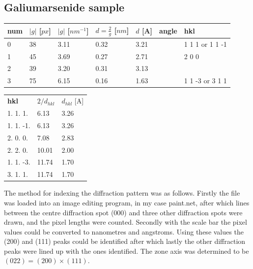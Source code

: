 \documentclass[a4paper]{scrartcl}
\begin{document}
\subsection*{Galiumarsenide sample}
\begin{table}[H]
  \centering
  \begin{tabular}{lllllll}
    \textbf{num} & $|g|$ [$px$] & $|g|$ [$nm^{-1}$] & $d=\frac{2}{g}$ [$nm$] & $d$ [A] & \textbf{angle} & \textbf{hkl}    \\ \hline
    0            & 38           & 3.11              & 0.32                   & 3.21    &                & 1 1 1 or 1 1 -1 \\
    1            & 45           & 3.69              & 0.27                   & 2.71    &                & 2 0 0           \\
    2            & 39           & 3.20              & 0.31                   & 3.13    &                &                 \\
    3            & 75           & 6.15              & 0.16                   & 1.63    &                & 1 1 -3 or 3 1 1
  \end{tabular}
  \label{tab:gaas-lit}
\end{table}
\begin{table}[H]
  \centering
  \begin{tabular}{lll}
    \textbf{hkl} & $2/d_{hkl}$ & $d_{hkl}$  [A] \\
    1. 1. 1.     & 6.13        & 3.26           \\
    1. 1. -1.    & 6.13        & 3.26           \\
    2. 0. 0.     & 7.08        & 2.83           \\
    2. 2. 0.     & 10.01       & 2.00           \\
    1. 1. -3.    & 11.74       & 1.70           \\
    3. 1. 1.     & 11.74       & 1.70
  \end{tabular}
\end{table}

The method for indexing the diffraction pattern was as follows. Firstly the file was loaded into an image editing program, in my case paint.net, after which lines between the centre diffraction spot (000) and three other diffraction spots were drawn, and the pixel lengths were counted. Secondly with the scale bar the pixel values could be converted to nanometres and angstroms. Using these values the (200) and (111) peaks could be identified after which lastly the other diffraction peaks were lined up with the ones identified.
The zone axis was determined to be $(022) = (200) \times (111)$.
\end{document}

